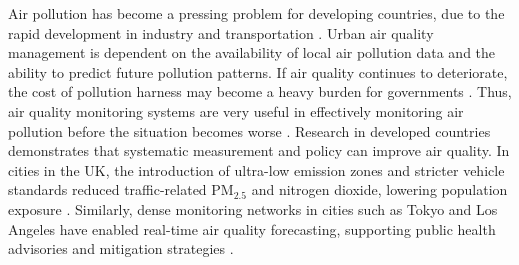 \documentclass[a4paper,fleqn]{cas-sc}
\begin{document}
Air pollution has become a pressing problem for developing countries, due to the rapid development in industry and transportation \cite{zheng2016design}. Urban air quality management is dependent on the availability of local air pollution data and the ability to predict future pollution patterns. If air quality continues to deteriorate, the cost of pollution harness may become a heavy burden for governments \cite{zheng2016design}. Thus, air quality monitoring systems are very useful in effectively monitoring air pollution before the situation becomes worse \cite{zheng2016design}. Research in developed countries demonstrates that systematic measurement and policy can improve air quality. In cities in the UK, the introduction of ultra-low emission zones and stricter vehicle standards reduced traffic-related PM$_{2.5}$ and nitrogen dioxide, lowering population exposure \cite{rodrigues2025london}. Similarly, dense monitoring networks in cities such as Tokyo and Los Angeles have enabled real-time air quality forecasting, supporting public health advisories and mitigation strategies \cite{agarwal2025assessing,lu2021estimating}.

\end{document}

